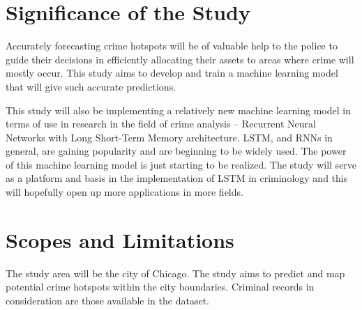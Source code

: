 \section{Significance of the Study} %

    Accurately forecasting crime hotspots will be of valuable help to the police to guide their decisions in efficiently allocating their assets to areas where crime will mostly occur. This study aims to develop and train a machine learning model that will give such accurate predictions.

    This study will also be implementing a relatively new machine learning model in terms of use in research in the field of crime analysis – Recurrent Neural Networks with Long Short-Term Memory architecture. LSTM, and RNNs in general, are gaining popularity and are beginning to be widely used. The power of this machine learning model is just starting to be realized. The study will serve as a platform and basis in the implementation of LSTM in criminology and this will hopefully open up more applications in more fields.

\section{Scopes and Limitations} %

    The study area will be the city of Chicago. The study aims to predict and map potential crime hotspots within the city boundaries. Criminal records in consideration are those available in the dataset.